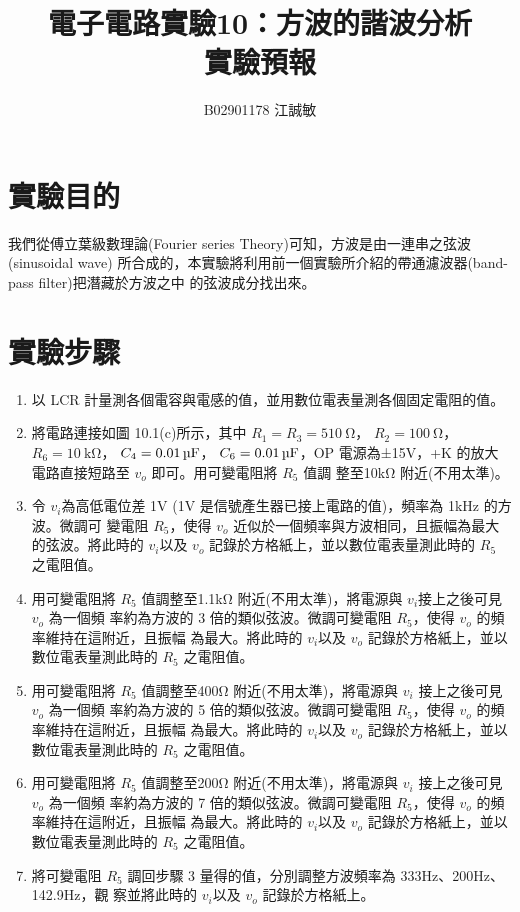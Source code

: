\documentclass[12pt, a4paper]{article}
\title{ \bf {\huge 電子電路實驗10：方波的諧波分析}\\ 實驗預報}
\author{B02901178 江誠敏}
\begin{document}
\maketitle

\section{實驗目的}
我們從傅立葉級數理論(Fourier series Theory)可知，方波是由一連串之弦波(sinusoidal wave)
所合成的，本實驗將利用前一個實驗所介紹的帶通濾波器(band-pass filter)把潛藏於方波之中
的弦波成分找出來。


\section{實驗步驟}
\begin{enumerate}[itemsep=0pt]
\item 以 LCR 計量測各個電容與電感的值，並用數位電表量測各個固定電阻的值。
\item 將電路連接如圖 10.1(c)所示，其中 $R_1 = R_3 = \SI{510}{\ohm} $， $R_2 = \SI{100}{\ohm}$， $R_6 = \SI{10}{\kohm} $， $C_4 = \SI{0.01}{\uF} $，
$C_6 = \SI{0.01}{\uF} $，OP 電源為±15V，+K 的放大電路直接短路至 $v_o$ 即可。用可變電阻將 $R_5$ 值調
整至10kΩ 附近(不用太準)。
\item 令 $v_i$為高低電位差 1V (1V 是信號產生器已接上電路的值)，頻率為 1kHz 的方波。微調可
變電阻 $R_5$，使得 $v_o$ 近似於一個頻率與方波相同，且振幅為最大的弦波。將此時的 $v_i$以及
$v_o$ 記錄於方格紙上，並以數位電表量測此時的 $R_5$ 之電阻值。
\item 用可變電阻將 $R_5$ 值調整至1.1kΩ 附近(不用太準)，將電源與 $v_i$接上之後可見 $v_o$ 為一個頻
率約為方波的 3 倍的類似弦波。微調可變電阻 $R_5$，使得 $v_o$ 的頻率維持在這附近，且振幅
為最大。將此時的 $v_i$以及 $v_o$ 記錄於方格紙上，並以數位電表量測此時的 $R_5$ 之電阻值。
\item 用可變電阻將 $R_5$ 值調整至400Ω 附近(不用太準)，將電源與 $v_i$ 接上之後可見 $v_o$ 為一個頻
率約為方波的 5 倍的類似弦波。微調可變電阻 $R_5$，使得 $v_o$ 的頻率維持在這附近，且振幅
為最大。將此時的 $v_i$以及 $v_o$ 記錄於方格紙上，並以數位電表量測此時的 $R_5$ 之電阻值。
\item 用可變電阻將 $R_5$ 值調整至200Ω 附近(不用太準)，將電源與 $v_i$ 接上之後可見 $v_o$ 為一個頻
率約為方波的 7 倍的類似弦波。微調可變電阻 $R_5$，使得 $v_o$ 的頻率維持在這附近，且振幅
為最大。將此時的 $v_i$以及 $v_o$ 記錄於方格紙上，並以數位電表量測此時的 $R_5$ 之電阻值。
\item 將可變電阻 $R_5$ 調回步驟 3 量得的值，分別調整方波頻率為 333Hz、200Hz、142.9Hz，觀
察並將此時的 $v_i$以及 $v_o$ 記錄於方格紙上。
\end{enumerate}
\end{document}
